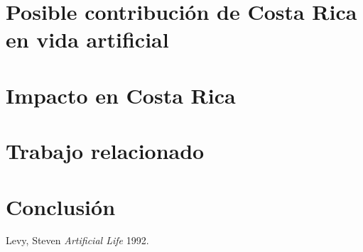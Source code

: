 \documentclass[conference]{IEEEtran}
\begin{document}
\section{Posible contribuci\'on de Costa Rica en vida artificial}


\section{Impacto en Costa Rica}


\section{Trabajo relacionado}


\section{Conclusi\'on}

\nocite{*}




	Levy, Steven 
	\emph{Artificial Life}
	1992. 		
\end{document}
